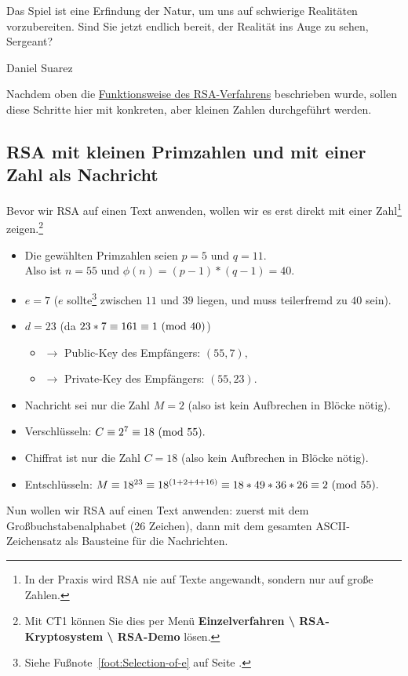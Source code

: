\begin{refsegment}
\begin{ctsquote}
\glqq Das Spiel ist eine Erfindung der Natur, um uns auf schwierige Realitäten vorzubereiten. Sind Sie jetzt endlich bereit, der Realität ins Auge zu sehen, Sergeant?\grqq
\caption[Daniel Suarez]{Daniel Suarez\footnotemark}
\end{ctsquote}
\addtocounter{footnote}{0}

Nachdem oben die \hyperlink{RSA}{Funktionsweise des RSA-Verfahrens} beschrieben
wurde, sollen diese Schritte hier mit konkreten, aber kleinen Zahlen
durchgeführt werden.


\subsection{RSA mit kleinen Primzahlen und mit einer Zahl als Nachricht}
Bevor wir RSA auf einen Text anwenden, wollen wir es erst direkt mit einer
Zahl\footnote{%
   In der Praxis wird RSA nie auf Texte angewandt, sondern nur auf große Zahlen.
}
zeigen.\footnote{%
   Mit CT1 können Sie dies per Menü {\bf Einzelverfahren
   \textbackslash{} RSA-Kryptosystem \textbackslash{} RSA-Demo} lösen.
}
\begin{itemize}
  \item[\bf 1.] Die gewählten Primzahlen seien $p=5$ und $q=11$.\\
                Also ist $n=55$ und $\phi(n) = (p-1)*(q-1)=40$.
  \item[\bf 2.] $e = 7$ ($e$ sollte\footnote{%
                Siehe Fußnote~\ref{foot:Selection-of-e} auf Seite
                \pageref{foot:Selection-of-e}.} zwischen $11$ und $39$ liegen,
                und muss teilerfremd
                zu $40$ sein).
  \item[\bf 3.] $d = 23$ (da $23*7 \equiv 161 \equiv 1{\rm ~(mod~}40)$)
  \begin{itemize}
     \item[] $\rightarrow$ Public-Key des Empfängers: $(55, 7),$
     \item[] $\rightarrow$ Private-Key des Empfängers: $(55, 23).$
  \end{itemize}
  \item[\bf 4.] Nachricht sei nur die Zahl $M = 2$ (also ist kein
                Aufbrechen in Blöcke nötig).
  \item[\bf 5.] Verschlüsseln: $C \equiv 2^7 \equiv 18 {\rm ~(mod~}55).$
  \item[\bf 6.] Chiffrat ist nur die Zahl $C = 18$ (also kein Aufbrechen
                in Blöcke nötig).
  \item[\bf 7.] Entschlüsseln: $M \equiv 18^{23} \equiv 18^{(1+2+4+16)} \equiv 18*49*36*26 \equiv 2 {\rm ~(mod~}55).$
\end{itemize}
Nun wollen wir RSA auf einen Text anwenden: zuerst mit dem
Großbuchstabenalphabet (26 Zeichen), dann mit dem gesamten
ASCII-Zeichensatz als Bausteine für die Nachrichten.



\end{refsegment}
